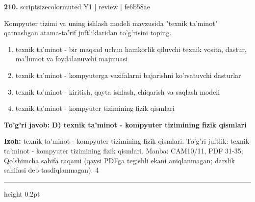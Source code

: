 \documentclass[10pt,a4paper]{article}
\begin{document}
{\bfseries\sffamily\color{ink} 210.} {scriptsizecolor{muted} Y1 | review | fe6b58ae}
\par
Kompyuter tizimi va uning ishlash modeli mavzusida "texnik ta'minot" qatnashgan atama-ta'rif juftliklaridan to'g'risini toping.
\begin{enumerate}[label=\Alph*),leftmargin=9mm]
\item texnik ta'minot - bir maqsad uchun hamkorlik qiluvchi texnik vosita, dastur, ma'lumot va foydalanuvchi majmuasi
\item texnik ta'minot - kompyuterga vazifalarni bajarishni ko'rsatuvchi dasturlar
\item texnik ta'minot - kiritish, qayta ishlash, chiqarish va saqlash modeli
\item texnik ta'minot - kompyuter tizimining fizik qismlari
\end{enumerate}
\begin{tcolorbox}[enhanced,breakable,colback=teal!4,colframe=teal!60!black,boxrule=0.45pt,arc=1.2mm,left=2.7mm,right=2.7mm,top=1.8mm,bottom=1.8mm,before skip=2mm,after skip=2mm]
{\bfseries\sffamily\color{teal}To'g'ri javob:} \textbf{D) texnik ta'minot - kompyuter tizimining fizik qismlari}
\par\smallskip
{\bfseries Izoh:} texnik ta'minot - kompyuter tizimining fizik qismlari. To'g'ri juftlik: texnik ta'minot - kompyuter tizimining fizik qismlari. Manba: CAM10/11, PDF 31-35; Qo'shimcha sahifa raqami (qaysi PDFga tegishli ekani aniqlanmagan; darslik sahifasi deb tasdiqlanmagan): 4
\end{tcolorbox}
\vspace{2mm}\hrule height 0.2pt\vspace{3mm}
\end{document}

